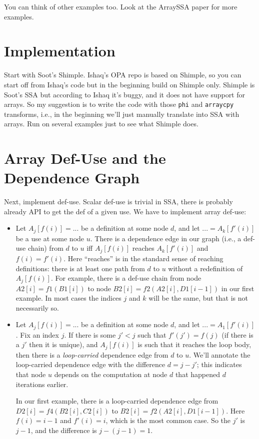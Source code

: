 \documentclass{article}
\begin{document}
You can think of other examples too. Look at the ArraySSA paper for more examples.

\section{Implementation} 

Start with Soot's Shimple. Ishaq's OPA repo is based on Shimple, so you can start off from Ishaq's code but in the beginning build on Shimple only. 
Shimple is Soot's SSA but according to Ishaq it's buggy, and it does not have support for arrays. So my suggestion is to write the code with those
\texttt{phi} and \texttt{arraycpy} transforms, i.e., in the beginning we'll just manually translate into SSA with arrays. Run on several examples just to see what Shimple does.

\section{Array Def-Use and the Dependence Graph}

Next, implement def-use. Scalar def-use is trivial in SSA, there is probably already API to get the def of a given use. We have to implement array def-use:
\begin{itemize}

\item Let $A_j[f(i)] = ...$ be a definition at some node $d$, and let $ ... = A_k[f'(i)]$ be a use at some node $u$. There is a dependence edge in our graph (i.e., a def-use chain) from $d$ to $u$ iff $A_j[f(i)]$ reaches $A_k[f'(i)]$ and $f(i) = f'(i)$. Here ``reaches'' is in the standard sense of reaching definitions: there is at least one path from $d$ to $u$ without a redefinition of $A_j[f(i)]$. For example, there is a def-use chain from node $A2[i] = f1(B1[i])$ to node $B2[i] = f2(A2[i], D1[i-1])$ in our first example. In most cases the indices $j$ and $k$ will be the same, but that is not necessarily so. 

\item Let $A_j[f(i)] = ...$ be a definition at some node $d$, and let $ ... = A_1[f'(i)]$. Fix an index $j$. If there is some $j' < j$ such that $f'(j') = f(j)$ (if there is a $j'$ then it is unique), and $A_j[f(i)]$ is such that it reaches the loop body, then there is a \emph{loop-carried} dependence edge from $d$ to $u$. We'll annotate the loop-carried dependence edge with the difference $d = j - j'$; this indicates that node $u$ depends on the computation at node $d$ that happened $d$ iterations earlier.

In our first example, there is a loop-carried dependence edge from $D2[i] = f4(B2[i], C2[i])$ to $B2[i] = f2(A2[i], D1[i-1])$. Here $f(i) = i-1$ and $f'(i) = i$, which is the most common case. So the $j'$ is $j-1$, and the difference is $j - (j - 1) = 1$. 

\end{itemize}
\end{document}
